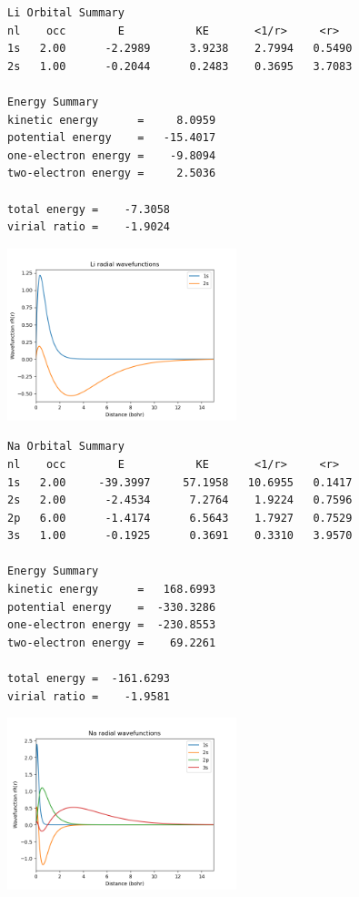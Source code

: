 \documentclass[11pt]{article}
\begin{document}
\label{}
\begin{verbatim}
Li Orbital Summary
nl    occ        E           KE       <1/r>     <r>
1s   2.00      -2.2989      3.9238    2.7994   0.5490
2s   1.00      -0.2044      0.2483    0.3695   3.7083

Energy Summary
kinetic energy      =     8.0959
potential energy    =   -15.4017
one-electron energy =    -9.8094
two-electron energy =     2.5036

total energy =    -7.3058
virial ratio =    -1.9024
\end{verbatim}


\begin{center}
\includegraphics[width=0.5\textwidth]{./Images/Li-wave-functions.png}
\end{center}


\label{}
\begin{verbatim}
Na Orbital Summary
nl    occ        E           KE       <1/r>     <r>
1s   2.00     -39.3997     57.1958   10.6955   0.1417
2s   2.00      -2.4534      7.2764    1.9224   0.7596
2p   6.00      -1.4174      6.5643    1.7927   0.7529
3s   1.00      -0.1925      0.3691    0.3310   3.9570

Energy Summary
kinetic energy      =   168.6993
potential energy    =  -330.3286
one-electron energy =  -230.8553
two-electron energy =    69.2261

total energy =  -161.6293
virial ratio =    -1.9581
\end{verbatim}


\begin{center}
\includegraphics[width=0.5\textwidth]{./Images/Na-wave-functions.png}
\end{center}
\end{document}
